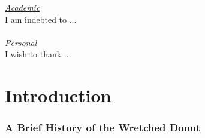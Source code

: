 \documentclass[11pt]{gthesis2}  %
\begin{document}
%
\indent \underline{\emph{Academic}}
\\
\indent I am indebted to ...                         %
\\
\\[.3cm]
%
\indent \underline{\emph{Personal}}
%
\\[.45cm]
\indent I wish to thank ...                         %
\\
%
%
%
%
\clearpage
%
%
\tableofcontents %
%
%
\clearpage
%
%
%
%
%
%
%
%
%
%
%
%
%
%
%
%
%
%
%
%
%
%
%
\DisplayTitle \vspace*{3em} \pagestyle{myheadings}
\setcounter{page}{1} \thispagestyle{empty}
%
%
%
%
\part{Introduction}
\label{part:intro}
%
%
\section{A Brief History of the Wretched Donut}
\label{sec:donut}
%
\end{document}
